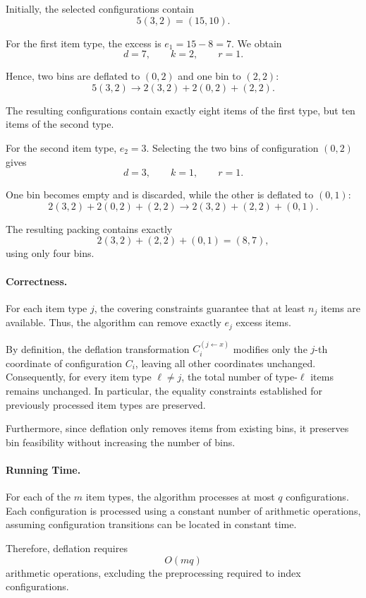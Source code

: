 Initially, the selected configurations contain
\[
    5(3,2)=(15,10).
\]

For the first item type, the excess is
$e_1=15-8=7$. We obtain
\[
    d=7,\qquad k=2,\qquad r=1.
\]

Hence, two bins are deflated to $(0,2)$
and one bin to $(2,2)$:
\[
    5(3,2)
    \longrightarrow
    2(3,2)+2(0,2)+(2,2).
\]

The resulting configurations contain
exactly eight items of the first type,
but ten items of the second type.

For the second item type, $e_2=3$.
Selecting the two bins of configuration
$(0,2)$ gives
\[
    d=3,\qquad k=1,\qquad r=1.
\]

One bin becomes empty and is discarded,
while the other is deflated to $(0,1)$:
\[
    2(3,2)+2(0,2)+(2,2)
    \longrightarrow
    2(3,2)+(2,2)+(0,1).
\]

The resulting packing contains exactly
\[
    2(3,2)+(2,2)+(0,1)=(8,7),
\]
using only four bins.



\paragraph{Correctness.}
For each item type $j$, the covering constraints
guarantee that at least $n_j$ items are available.
Thus, the algorithm can remove exactly $e_j$
excess items.

By definition, the deflation transformation
$C_i^{(j\leftarrow x)}$ modifies only the
$j$-th coordinate of configuration $C_i$,
leaving all other coordinates unchanged.
Consequently, for every item type $\ell\neq j$,
the total number of type-$\ell$ items remains
unchanged. In particular, the equality constraints
established for previously processed item types
are preserved.

Furthermore, since deflation only removes items
from existing bins, it preserves bin feasibility
without increasing the number of bins.



\paragraph{Running Time.}
For each of the $m$ item types, the algorithm
processes at most $q$ configurations.
Each configuration is processed using a
constant number of arithmetic operations,
assuming configuration transitions can be
located in constant time.

Therefore, deflation requires
\[
    O(mq)
\]
arithmetic operations, excluding the
preprocessing required to index configurations.

